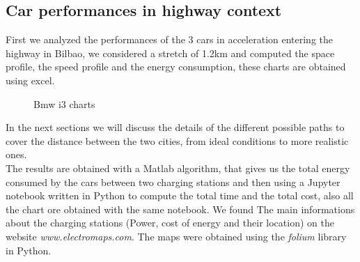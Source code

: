 \documentclass{article}
\begin{document}
\subsection{Car performances in highway context}
First we analyzed the performances of the 3 cars in acceleration entering the highway in Bilbao, we considered a stretch of 1.2km and computed the space profile, the speed profile and the energy consumption, these charts are obtained using excel. 
\begin{figure}[H]
\end{figure}
{\centering
\begin{figure}[H]
\centering
{}
\qquad
{}
\qquad
{}
\qquad
{}
\qquad
{}
\caption{Bmw i3 charts}
\end{figure}}
\begin{figure}[H]
\end{figure}
\newpage
In the next sections we will discuss the details of the different possible paths to cover the distance between the two cities, from ideal conditions to more realistic ones.\\
The results are obtained with a Matlab algorithm, that gives us the total energy consumed by the cars between two charging stations and then using a Jupyter notebook written in Python to compute the total time and the total cost, also all the chart ore obtained with the same notebook. 
We found The main informations about the charging stations (Power, cost of energy and their location) on the website \textit{www.electromaps.com}. The maps were obtained using the \textit{folium} library in Python.\\
\end{document}
